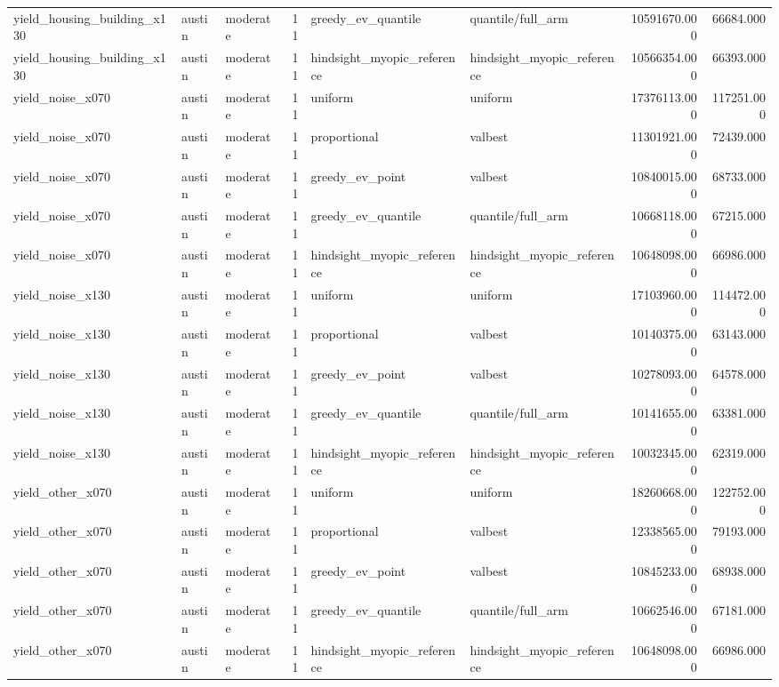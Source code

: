 \begin{tabular}{lllrllrr}
yield\_housing\_building\_x130 & austin & moderate & 11 & greedy\_ev\_quantile & quantile/full\_arm & 10591670.000 & 66684.000 \\
yield\_housing\_building\_x130 & austin & moderate & 11 & hindsight\_myopic\_reference & hindsight\_myopic\_reference & 10566354.000 & 66393.000 \\
yield\_noise\_x070 & austin & moderate & 11 & uniform & uniform & 17376113.000 & 117251.000 \\
yield\_noise\_x070 & austin & moderate & 11 & proportional & valbest & 11301921.000 & 72439.000 \\
yield\_noise\_x070 & austin & moderate & 11 & greedy\_ev\_point & valbest & 10840015.000 & 68733.000 \\
yield\_noise\_x070 & austin & moderate & 11 & greedy\_ev\_quantile & quantile/full\_arm & 10668118.000 & 67215.000 \\
yield\_noise\_x070 & austin & moderate & 11 & hindsight\_myopic\_reference & hindsight\_myopic\_reference & 10648098.000 & 66986.000 \\
yield\_noise\_x130 & austin & moderate & 11 & uniform & uniform & 17103960.000 & 114472.000 \\
yield\_noise\_x130 & austin & moderate & 11 & proportional & valbest & 10140375.000 & 63143.000 \\
yield\_noise\_x130 & austin & moderate & 11 & greedy\_ev\_point & valbest & 10278093.000 & 64578.000 \\
yield\_noise\_x130 & austin & moderate & 11 & greedy\_ev\_quantile & quantile/full\_arm & 10141655.000 & 63381.000 \\
yield\_noise\_x130 & austin & moderate & 11 & hindsight\_myopic\_reference & hindsight\_myopic\_reference & 10032345.000 & 62319.000 \\
yield\_other\_x070 & austin & moderate & 11 & uniform & uniform & 18260668.000 & 122752.000 \\
yield\_other\_x070 & austin & moderate & 11 & proportional & valbest & 12338565.000 & 79193.000 \\
yield\_other\_x070 & austin & moderate & 11 & greedy\_ev\_point & valbest & 10845233.000 & 68938.000 \\
yield\_other\_x070 & austin & moderate & 11 & greedy\_ev\_quantile & quantile/full\_arm & 10662546.000 & 67181.000 \\
yield\_other\_x070 & austin & moderate & 11 & hindsight\_myopic\_reference & hindsight\_myopic\_reference & 10648098.000 & 66986.000 \\

\end{tabular}
